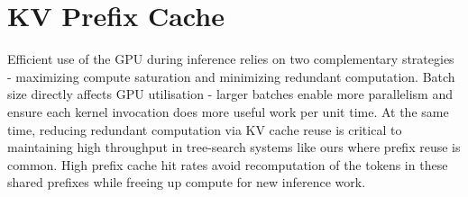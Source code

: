 \documentclass[12pt,twoside]{report}
\begin{document}
\section{KV Prefix Cache}

Efficient use of the GPU during inference relies on two complementary strategies - maximizing compute saturation and minimizing redundant computation. 
Batch size directly affects GPU utilisation - larger batches enable more parallelism and ensure each kernel invocation does more useful work per unit time. 
At the same time, reducing redundant computation via KV cache reuse is critical to maintaining high throughput in tree-search systems like ours where prefix reuse is common.
High prefix cache hit rates avoid recomputation of the tokens in these shared prefixes while freeing up compute for new inference work.
\end{document}
